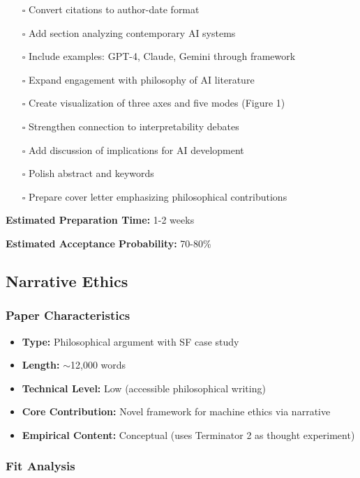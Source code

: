\documentclass[12pt]{article}
\begin{document}
\begin{enumerate}[leftmargin=*]
\item[$\square$] Convert citations to author-date format
\item[$\square$] Add section analyzing contemporary AI systems
\item[$\square$] Include examples: GPT-4, Claude, Gemini through framework
\item[$\square$] Expand engagement with philosophy of AI literature
\item[$\square$] Create visualization of three axes and five modes (Figure 1)
\item[$\square$] Strengthen connection to interpretability debates
\item[$\square$] Add discussion of implications for AI development
\item[$\square$] Polish abstract and keywords
\item[$\square$] Prepare cover letter emphasizing philosophical contributions
\end{enumerate}

\textbf{Estimated Preparation Time:} 1-2 weeks

\textbf{Estimated Acceptance Probability:} 70-80\%

\subsection{Narrative Ethics}

\subsubsection{Paper Characteristics}

\begin{itemize}[leftmargin=*]
\item \textbf{Type:} Philosophical argument with SF case study
\item \textbf{Length:} $\sim$12,000 words
\item \textbf{Technical Level:} Low (accessible philosophical writing)
\item \textbf{Core Contribution:} Novel framework for machine ethics via narrative
\item \textbf{Empirical Content:} Conceptual (uses Terminator 2 as thought experiment)
\end{itemize}

\subsubsection{Fit Analysis}
\end{document}
